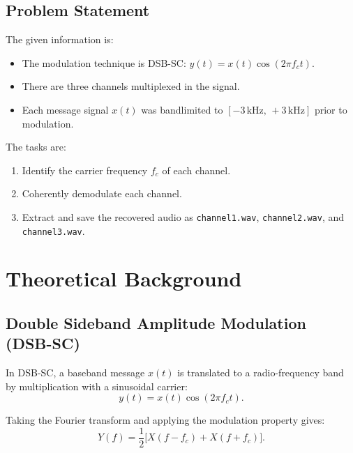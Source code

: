 \documentclass[12pt, a4paper]{article}
\begin{document}
\subsection{Problem Statement}

The given information is:
\begin{itemize}[nosep]
    \item The modulation technique is DSB-SC: $y(t) = x(t)\cos(2\pi f_c t)$.
    \item There are three channels multiplexed in the signal.
    \item Each message signal $x(t)$ was bandlimited to $[-3\,\text{kHz},\,+3\,\text{kHz}]$
          prior to modulation.
\end{itemize}

The tasks are:
\begin{enumerate}[nosep]
    \item Identify the carrier frequency $f_c$ of each channel.
    \item Coherently demodulate each channel.
    \item Extract and save the recovered audio as \texttt{channel1.wav},
          \texttt{channel2.wav}, and \texttt{channel3.wav}.
\end{enumerate}

\section{Theoretical Background}

\subsection{Double Sideband Amplitude Modulation (DSB-SC)}

In DSB-SC, a baseband message $x(t)$ is translated to a radio-frequency band by
multiplication with a sinusoidal carrier:
\begin{equation}
    y(t) = x(t)\cos(2\pi f_c t).
    \label{eq:dsbsc_mod}
\end{equation}

Taking the Fourier transform and applying the modulation property gives:
\begin{equation}
    Y(f) = \frac{1}{2}\bigl[X(f - f_c) + X(f + f_c)\bigr].
    \label{eq:dsbsc_spectrum}
\end{equation}
\end{document}
